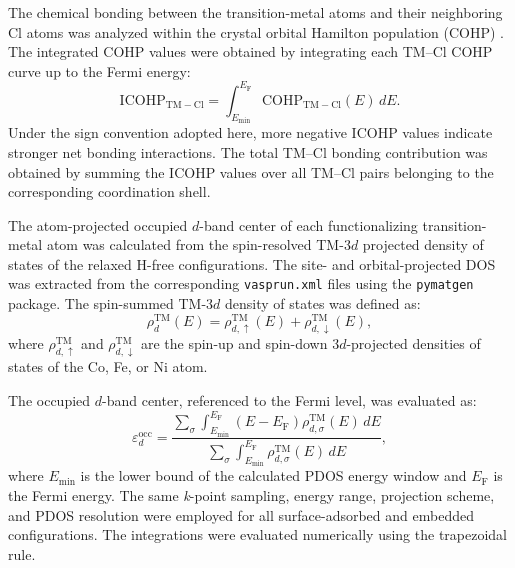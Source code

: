 \documentclass[journal=jacsat,manuscript=article]{achemso}
\begin{document}
The chemical bonding between the transition-metal atoms and their neighboring Cl atoms was analyzed within the crystal orbital Hamilton population (COHP)  \cite{Dronskowki2002}. The integrated COHP values were obtained by integrating each TM--Cl COHP curve up to the Fermi energy:
\begin{equation}
    \mathrm{ICOHP}_{\mathrm{TM-Cl}}
    =
    \int_{E_{\min}}^{E_{\mathrm{F}}}
    \mathrm{COHP}_{\mathrm{TM-Cl}}(E)\,dE.
    \label{eq:ICOHP}
\end{equation}
Under the sign convention adopted here, more negative ICOHP values indicate stronger net bonding interactions. The total TM--Cl bonding contribution was obtained by summing the ICOHP values over all TM--Cl pairs belonging to the corresponding coordination shell.

The atom-projected occupied $d$-band center of each functionalizing transition-metal atom was calculated from the spin-resolved TM-$3d$ projected density of states of the relaxed H-free configurations. The site- and orbital-projected DOS was extracted from the corresponding \texttt{vasprun.xml} files using the \texttt{pymatgen} package. The spin-summed TM-$3d$ density of states was defined as:
\begin{equation}
    \rho_{d}^{\mathrm{TM}}(E)
    =
    \rho_{d,\uparrow}^{\mathrm{TM}}(E)
    +
    \rho_{d,\downarrow}^{\mathrm{TM}}(E),
    \label{eq:spin_summed_dos}
\end{equation}
where $\rho_{d,\uparrow}^{\mathrm{TM}}$ and
$\rho_{d,\downarrow}^{\mathrm{TM}}$ are the spin-up and
spin-down $3d$-projected densities of states of the Co, Fe,
or Ni atom.

The occupied $d$-band center, referenced to the Fermi level,
was evaluated as:
\begin{equation}
    \varepsilon_{d}^{\mathrm{occ}}
    =
    \frac{
    \displaystyle
    \sum_{\sigma}
    \int_{E_{\min}}^{E_{\mathrm{F}}}
    (E-E_{\mathrm{F}})
    \rho_{d,\sigma}^{\mathrm{TM}}(E)\,dE
    }{
    \displaystyle
    \sum_{\sigma}
    \int_{E_{\min}}^{E_{\mathrm{F}}}
    \rho_{d,\sigma}^{\mathrm{TM}}(E)\,dE
    },
    \label{eq:d_band_center}
\end{equation}
where $E_{\min}$ is the lower bound of the calculated PDOS energy window and $E_{\mathrm{F}}$ is the Fermi energy. The same \textit{k}-point sampling, energy range, projection scheme, and PDOS resolution were employed for all surface-adsorbed and embedded configurations. The integrations were evaluated numerically using the trapezoidal rule.
\end{document}
